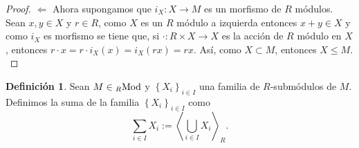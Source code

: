 \documentclass{article}
\newcommand{\arbtfam}[3]{
	{\left\{{#1}_{#2}\right\}}_{#2\in #3}
}
\newcommand{\gengroup}[1]{
	\left< #1\right>
}
\newcommand{\ringmod}[3]{
	\if#3l
	{}_{#1}#2
	\else
	\if#3r
	#2_{#1}
	\fi
	\fi
}
\theoremstyle{definition}
\newtheorem{define}{Definición}
\theoremstyle{plain}
\theoremstyle{plain}
\theoremstyle{definition}
\theoremstyle{definition}
\theoremstyle{definition}
\theoremstyle{definition}
\theoremstyle{definition}
\theoremstyle{definition}
\begin{document}
\begin{enumerate}[label=\textbf{Ej \arabic*.}]
\begin{proof}
	$\boxed{\Leftarrow}$ Ahora supongamos que  $i_X:X\longrightarrow M$ es un morfismo de $R$ módulos.\\
	
	Sean $x,y\in X$ y $r\in R$, como $X$ es un $R$ módulo a izquierda entonces $x+y\in X$ y como $i_X$ es morfismo
	se tiene que, si $\cdot: R\times X\longrightarrow X$ es la acción de $R$ módulo en $X$, entonces 
	$r\cdot x = r\cdot i_X(x) = i_X(rx)=rx $. Así, como $X\subset M$, entonces $X\leq M$.\\
\end{proof}

\begin{define}
	Sean $M\in\ringmod{R}{\text{Mod}}{l}$ y $\arbtfam{X}{i}{I}$ una familia de $R$-submódulos de $M$. Definimos la suma de la familia $\arbtfam{X}{i}{I}$ como
	\begin{equation*}
		\sum_{i\in I}X_i:=\gengroup{\bigcup_{i\in I}X_i}_R.
	\end{equation*}
\end{define}


\end{enumerate}
\end{document}

